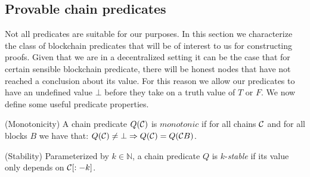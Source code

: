 \subsection{Provable chain predicates}

Not all predicates are suitable for our purposes. In this section we characterize the class of
blockchain predicates that will be of interest to us for constructing proofs.
Given that we are in a decentralized setting it can be the case that for certain
sensible blockchain predicate, there will be honest nodes that have not reached
a conclusion about its value. For this reason we allow our predicates to have an
undefined value $\bot$ before they take on a truth value of $T$ or $F$.
We now define some useful predicate properties.

\begin{definition}{(Monotonicity)}
    A chain predicate $Q(\mathcal{C})$ is $\textit{monotonic}$ if for all chains
    $\mathcal{C}$ and for all blocks $B$ we have that:
    $Q(\mathcal{C}) \neq \bot \Rightarrow Q(\mathcal{C}) = Q(\mathcal{C} B)$.
\end{definition}

\begin{definition}{(Stability)}
    Parameterized by $k \in \mathbb{N}$, a chain predicate
    $Q$ is $k$-\textit{stable} if its value only depends on $\mathcal{C}[:-k]$.

\end{definition}
%
